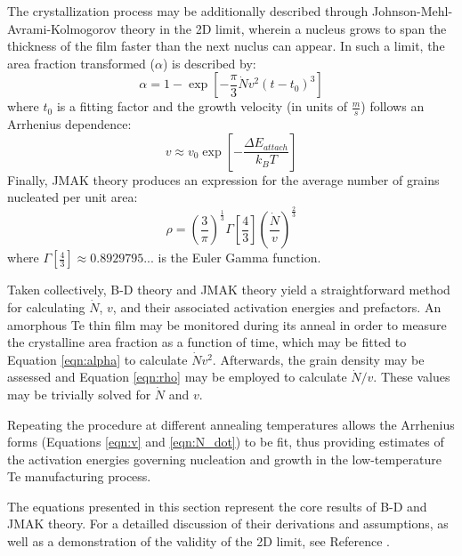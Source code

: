 The crystallization process may be additionally described through Johnson-Mehl-Avrami-Kolmogorov theory in the 2D limit, wherein a nucleus grows to span the thickness of the film faster than the next nuclus can appear.  In such a limit, the area fraction transformed ($\alpha$) is described by:
%
	\begin{equation}
		\alpha = 1 - \exp
		\left[ -\frac{\pi}{3}\dot{N}v^2(t - t_0)^3 \right]
	\label{eqn:alpha}
	\end{equation}
%
where $t_0$ is a fitting factor and the growth velocity (in units of $\frac{m}{s}$) follows an Arrhenius dependence:
%
	\begin{equation}
		v \approx v_0 \exp \left[ - \frac{\Delta E_{attach}}{k_B T} \right]
	\label{eqn:v}
	\end{equation}
%
Finally, JMAK theory produces an expression for the average number of grains nucleated per unit area:
%
	\begin{equation}
		\rho = \left(\frac{3}{\pi}\right)^{\frac{1}{3}}
		\Gamma \left[ \frac{4}{3} \right]
		\left( \frac{\dot{N}}{v} \right)^{\frac{2}{3}}
	\label{eqn:rho}
	\end{equation}
%
where $\Gamma \left[ \frac{4}{3} \right] \approx 0.8929795...$ is the Euler Gamma function.

Taken collectively, B-D theory and JMAK theory yield a straightforward method for calculating $\dot{N}$, $v$, and their associated activation energies and prefactors.  An amorphous Te thin film may be monitored during its anneal in order to measure the crystalline area fraction as a function of time, which may be fitted to Equation \ref{eqn:alpha} to calculate $\dot{N}v^2$.  Afterwards, the grain density may be assessed and Equation \ref{eqn:rho} may be employed to calculate $\dot{N}/v$.  These values may be trivially solved for $\dot{N}$ and ${v}$.

Repeating the procedure at different annealing temperatures allows the Arrhenius forms (Equations \ref{eqn:v} and \ref{eqn:N_dot}) to be fit, thus providing estimates of the activation energies governing nucleation and growth in the low-temperature Te manufacturing process.

The equations presented in this section represent the core results of B-D and JMAK theory.  For a detailled discussion of their derivations and assumptions, as well as a demonstration of the validity of the 2D limit, see Reference \cite{chrzan:2020}.
